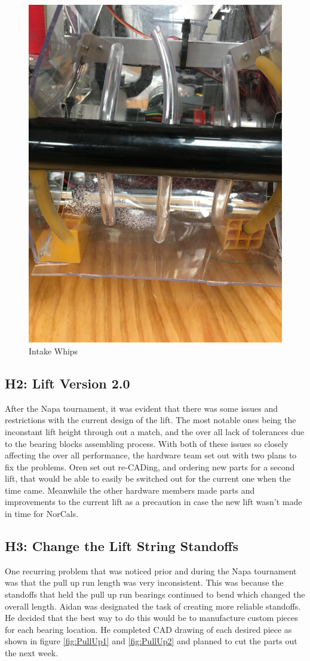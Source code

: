 \documentclass{article}
\begin{document}
\begin{figure}
    \centering
    \includegraphics[width=.6 \textwidth]{24_02-11/images/intakewhips.JPG}
    \caption{Intake Whips}
    \label{fig:whips}
\end{figure}

\subsection{H2: Lift Version 2.0}

After the Napa tournament, it was evident that there was some issues and restrictions with the current design of the lift. The most notable ones being the inconstant lift height through out a match, and the over all lack of tolerances due to the bearing blocks assembling process. With both of these issues so closely affecting the over all performance, the hardware team set out with two plans to fix the problems. Oren set out re-CADing, and ordering new parts for a second lift, that would be able to easily be switched out for the current one when the time came. Meanwhile the other hardware members made parts and improvements to the current lift as a precaution in case the new lift wasn't made in time for NorCals. 


\subsection{H3: Change the Lift String Standoffs}

One recurring problem that was noticed prior and during the Napa tournament was that the pull up run length was very inconsistent. This was because the standoffs that held the pull up run bearings continued to bend which changed the overall length. Aidan was designated the task of creating more reliable standoffs. He decided that the best way to do this would be to manufacture custom pieces for each bearing location. He completed CAD drawing of each desired piece as shown in figure \ref{fig:PullUp1} and \ref{fig:PullUp2} and planned to cut the parts out the next week.
\end{document}

